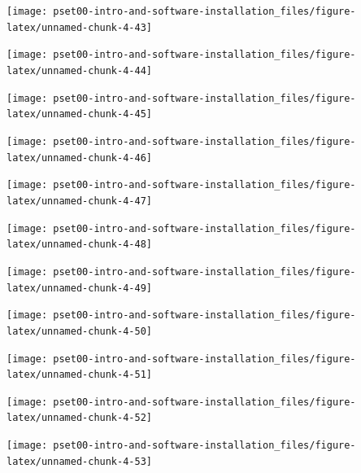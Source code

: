 \documentclass[
]{article}
\begin{document}
\begin{center}\texttt{[image: pset00-intro-and-software-installation\_files/figure-latex/unnamed-chunk-4-43]} \end{center}

\begin{center}\texttt{[image: pset00-intro-and-software-installation\_files/figure-latex/unnamed-chunk-4-44]} \end{center}

\begin{center}\texttt{[image: pset00-intro-and-software-installation\_files/figure-latex/unnamed-chunk-4-45]} \end{center}

\begin{center}\texttt{[image: pset00-intro-and-software-installation\_files/figure-latex/unnamed-chunk-4-46]} \end{center}

\begin{center}\texttt{[image: pset00-intro-and-software-installation\_files/figure-latex/unnamed-chunk-4-47]} \end{center}

\begin{center}\texttt{[image: pset00-intro-and-software-installation\_files/figure-latex/unnamed-chunk-4-48]} \end{center}

\begin{center}\texttt{[image: pset00-intro-and-software-installation\_files/figure-latex/unnamed-chunk-4-49]} \end{center}

\begin{center}\texttt{[image: pset00-intro-and-software-installation\_files/figure-latex/unnamed-chunk-4-50]} \end{center}

\begin{center}\texttt{[image: pset00-intro-and-software-installation\_files/figure-latex/unnamed-chunk-4-51]} \end{center}

\begin{center}\texttt{[image: pset00-intro-and-software-installation\_files/figure-latex/unnamed-chunk-4-52]} \end{center}

\begin{center}\texttt{[image: pset00-intro-and-software-installation\_files/figure-latex/unnamed-chunk-4-53]} \end{center}
\end{document}
